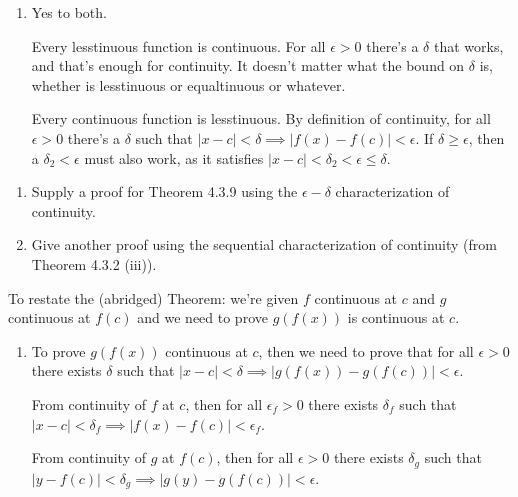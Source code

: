 \documentclass{oxmathproblems}
\begin{document}
\begin{questions}
\begin{solution}
\begin{enumerate}[label=(\alph*)]
    $f(x)=x^2$ also works. It's lesstinuous everywhere (too lazy to type the $\epsilon-\delta$ derivation). But it's not nowhere equaltinuous. Again choose
    $x=c+\frac{\epsilon}{2}$. Then $|f(x)-f(c)| = \epsilon|c| + \frac{\epsilon^2}{4}$. If this were equaltinuous, then for \textit{all} $\epsilon > 0$
    we need $|f(x)-f(c)| < \epsilon$. But for any $\epsilon > 4$ this is false.

    \item Yes to both.
    
    Every lesstinuous function is continuous. For all $\epsilon > 0$ there's a $\delta$ that works, and that's enough for continuity. It doesn't matter what the bound on $\delta$
    is, whether is lesstinuous or equaltinuous or whatever.

    Every continuous function is lesstinuous. By definition of continuity, for all $\epsilon > 0$ there's a $\delta$ such that $|x-c| < \delta \implies |f(x)-f(c)| < \epsilon$.
    If $\delta \geq \epsilon$, then a $\delta_{2} < \epsilon$ must also work, as it satisfies $|x-c| < \delta_{2} < \epsilon \leq \delta$.
  \end{enumerate}
\end{solution}

\miquestion
\begin{enumerate}[label=(\alph*)]
  \item Supply a proof for Theorem 4.3.9 using the $\epsilon-\delta$ characterization of continuity.
  \item Give another proof using the sequential characterization of continuity (from Theorem 4.3.2 (iii)).
\end{enumerate}

\begin{solution}
  To restate the (abridged) Theorem: we're given $f$ continuous at $c$ and $g$ continuous at $f(c)$ and we need to prove $g(f(x))$ is continuous at $c$.
  \begin{enumerate}[label=(\alph*)]
    \item To prove $g(f(x))$ continuous at $c$, then we need to prove that for all $\epsilon > 0$ there exists $\delta$ such that $|x-c| < \delta \implies |g(f(x)) - g(f(c))| < \epsilon$.
    
    From continuity of $f$ at $c$, then for all $\epsilon_{f} > 0$ there exists $\delta_{f}$ such that $|x-c| < \delta_{f} \implies |f(x)-f(c)| < \epsilon_{f}$.

    From continuity of $g$ at $f(c)$, then for all $\epsilon > 0$ there exists $\delta_{g}$ such that $|y-f(c)| < \delta_{g} \implies |g(y)-g(f(c))| < \epsilon$.


\end{enumerate}
\end{solution}
\end{questions}
\end{document}
